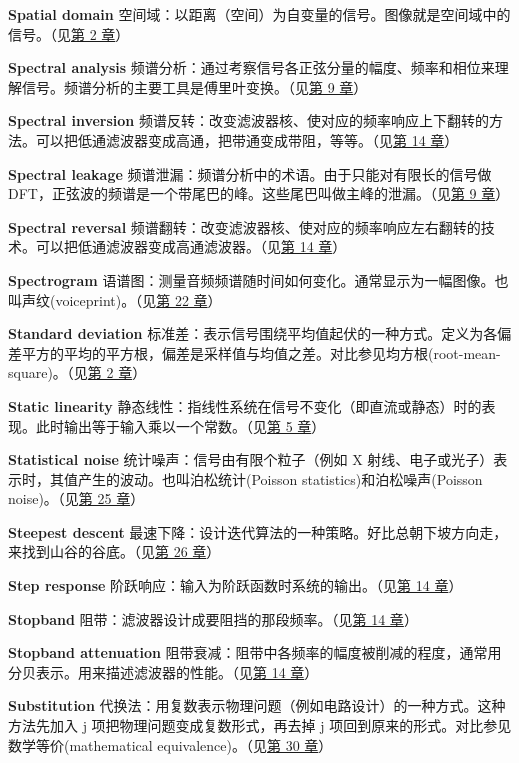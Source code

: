 \textbf{Spatial domain}
空间域：以距离（空间）为自变量的信号。图像就是空间域中的信号。（见\hyperref[ch-02]{第
2 章}）

\textbf{Spectral analysis}
频谱分析：通过考察信号各正弦分量的幅度、频率和相位来理解信号。频谱分析的主要工具是傅里叶变换。（见\hyperref[ch-09]{第
9 章}）

\textbf{Spectral inversion}
频谱反转：改变滤波器核、使对应的频率响应上下翻转的方法。可以把低通滤波器变成高通，把带通变成带阻，等等。（见\hyperref[ch-14]{第
14 章}）

\textbf{Spectral leakage}
频谱泄漏：频谱分析中的术语。由于只能对有限长的信号做
DFT，正弦波的频谱是一个带尾巴的峰。这些尾巴叫做主峰的泄漏。（见\hyperref[ch-09]{第
9 章}）

\textbf{Spectral reversal}
频谱翻转：改变滤波器核、使对应的频率响应左右翻转的技术。可以把低通滤波器变成高通滤波器。（见\hyperref[ch-14]{第
14 章}）

\textbf{Spectrogram}
语谱图：测量音频频谱随时间如何变化。通常显示为一幅图像。也叫声纹(voiceprint)。（见\hyperref[ch-22]{第
22 章}）

\textbf{Standard deviation}
标准差：表示信号围绕平均值起伏的一种方式。定义为各偏差平方的平均的平方根，偏差是采样值与均值之差。对比参见均方根(root-mean-square)。（见\hyperref[ch-02]{第
2 章}）

\textbf{Static linearity}
静态线性：指线性系统在信号不变化（即直流或静态）时的表现。此时输出等于输入乘以一个常数。（见\hyperref[ch-05]{第
5 章}）

\textbf{Statistical noise} 统计噪声：信号由有限个粒子（例如 X
射线、电子或光子）表示时，其值产生的波动。也叫泊松统计(Poisson
statistics)和泊松噪声(Poisson noise)。（见\hyperref[ch-25]{第 25 章}）

\textbf{Steepest descent}
最速下降：设计迭代算法的一种策略。好比总朝下坡方向走，来找到山谷的谷底。（见\hyperref[ch-26]{第
26 章}）

\textbf{Step response}
阶跃响应：输入为阶跃函数时系统的输出。（见\hyperref[ch-14]{第 14 章}）

\textbf{Stopband}
阻带：滤波器设计成要阻挡的那段频率。（见\hyperref[ch-14]{第 14 章}）

\textbf{Stopband attenuation}
阻带衰减：阻带中各频率的幅度被削减的程度，通常用分贝表示。用来描述滤波器的性能。（见\hyperref[ch-14]{第
14 章}）

\textbf{Substitution}
代换法：用复数表示物理问题（例如电路设计）的一种方式。这种方法先加入 j
项把物理问题变成复数形式，再去掉 j
项回到原来的形式。对比参见数学等价(mathematical
equivalence)。（见\hyperref[ch-30]{第 30 章}）

